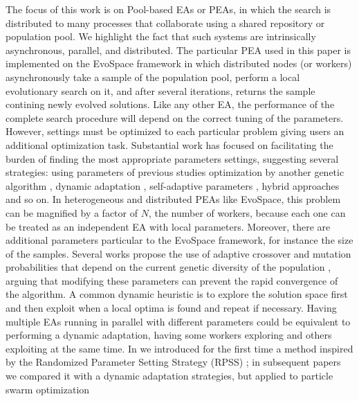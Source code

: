 \documentclass[conference]{IEEEtran}
\begin{document}
The focus of this work is on Pool-based EAs or PEAs, in which the search
is distributed to many processes that collaborate using a shared
repository or population pool. We highlight the fact that such
systems are intrinsically asynchronous, parallel, and distributed.
The particular PEA used in this paper is implemented on
the EvoSpace framework \cite{GValdez2015}
in which distributed nodes (or workers) asynchronously take a
sample of the population pool,  perform a local evolutionary search 
on it, and after several iterations, returns the sample contining 
newly evolved solutions.
Like any other EA, the performance of the complete search procedure will depend
on the correct tuning of the parameters. However, settings
must be optimized to each particular problem \cite{de2007parameter}
giving users an additional optimization task.
Substantial work has focused on facilitating the burden of finding
the most appropriate parameters settings, suggesting several strategies:
using parameters of previous studies \cite{eiben1999parameter}
optimization by another genetic algorithm \cite{grefenstette1986optimization},
dynamic adaptation \cite{eiben1999parameter},
self-adaptive parameters \cite{pellerin2004self}, hybrid approaches \cite{de2007parameter} and so on.
In heterogeneous and distributed PEAs like EvoSpace, this problem can
be magnified by a factor of $N$, the number of workers, because each one
can be treated as an independent EA with local parameters. Moreover, there
are additional parameters particular to the EvoSpace framework,
for instance the size of the samples.
Several works propose the use of adaptive crossover and mutation probabilities
that depend on the current genetic diversity of the population \cite{pellerin2004self},
arguing that modifying these parameters can prevent the rapid convergence of the
algorithm.
A common dynamic heuristic is to explore the solution space first and then exploit
when a local optima is found and repeat if necessary.
Having multiple EAs running in parallel with different parameters could be
equivalent to performing a dynamic adaptation, having some workers exploring
and others exploiting at the same time.
In \cite{LNCS86720702} we introduced for the first time a method
inspired by the Randomized Parameter
Setting Strategy (RPSS) \cite{fuku1,fuku2}; in subsequent papers
\cite{hernandez2017randomized} we compared it with a dynamic
adaptation strategies, but applied to particle swarm optimization
\end{document}

